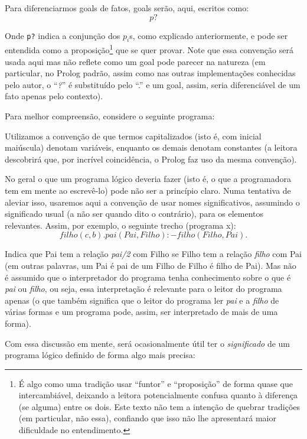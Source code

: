 \documentclass{article}
\theoremstyle{definition}
\theoremstyle{remark}
\begin{document}
Para diferenciarmos goals de fatos, goals serão, aqui, escritos como:
\[
  p?
\]

Onde {\tt p?} indica a conjunção dos $p_i$s, como explicado anteriormente, e pode ser entendida como a proposição\footnote{É algo como uma tradição usar ``funtor'' e ``proposição'' de forma quase que intercambiável, deixando a leitora potencialmente confusa quanto à diferença (se alguma) entre os dois. Este texto não tem a intenção de quebrar tradições (em particular, não essa), confiando que isso não lhe apresentará maior dificuldade no entendimento.} que se quer provar. Note que essa convenção será usada aqui mas não reflete como um goal pode parecer na natureza (em particular, no
Prolog padrão, assim como nas outras implementações conhecidas pelo autor, o ``\textit{?}'' é substituído pelo ``.'' e um goal, assim, seria diferenciável de um fato apenas pelo contexto).

Para melhor compreensão, considere o seguinte programa:



Utilizamos a convenção de que termos capitalizados (isto é, com inicial maiúscula) denotam variáveis, enquanto os demais denotam constantes (a leitora descobrirá que, por incrível coincidência, o Prolog faz uso da mesma convenção).

No geral o que um programa lógico deveria fazer (isto é, o que a programadora tem em mente ao escrevê-lo) pode não ser a princípio claro. Numa tentativa de aleviar isso, usaremos aqui a convenção de usar nomes significativos, assumindo o significado usual (a não ser quando dito o contrário), para os elementos relevantes. Assim, por exemplo, o seguinte trecho (programa x):
\[
  filho(c,b).
  pai(Pai, Filho) :- filho(Filho, Pai).
\]

Indica que Pai tem a relação \textit{pai/2} com Filho se Filho tem a relação \textit{filho} com Pai (em outras palavras, um Pai é pai de um Filho de Filho é filho de Pai). Mas não é assumido que o interpretador do programa tenha conhecimento sobre o que é \textit{pai} ou \textit{filho}, ou seja, essa interpretação é relevante para o leitor do programa apenas (o que também significa que o leitor do programa ler \textit{pai} e a \textit{filho} de várias formas e um programa pode, assim,
ser interpretado de mais de uma forma).

Com essa discussão em mente, será ocasionalmente útil ter o \textit{significado} de um programa lógico definido de forma algo mais precisa:
\end{document}
